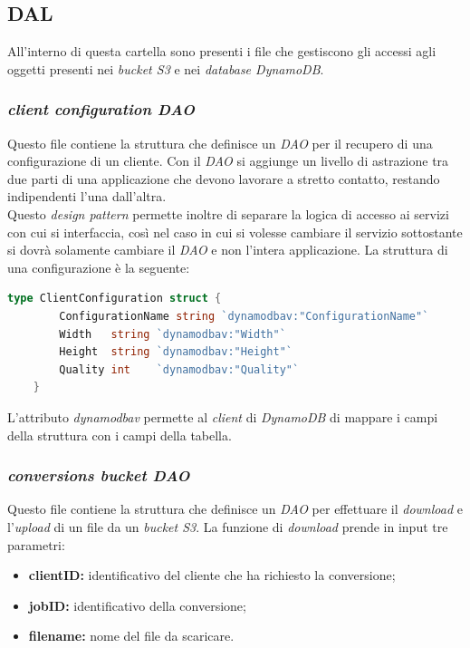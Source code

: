 \subsection{DAL}

All'interno di questa cartella sono presenti i file che gestiscono gli accessi
agli oggetti presenti nei \emph{bucket S3} e nei \emph{database DynamoDB}.

\subsubsection{\emph{client configuration DAO}}

Questo file contiene la struttura che definisce un \emph{DAO} per il recupero di
una configurazione di un cliente. Con il \emph{DAO} si aggiunge un livello di
astrazione tra due parti di una applicazione che devono lavorare a stretto
contatto, restando indipendenti l'una dall'altra.\\
Questo \emph{design pattern} permette inoltre di separare la logica di accesso
ai servizi con cui si interfaccia, così nel caso in cui si volesse cambiare il
servizio sottostante si dovrà solamente cambiare il \emph{DAO} e non l'intera
applicazione. La struttura di una configurazione è la seguente:
\begin{lstlisting}[language=go]
type ClientConfiguration struct {
        ConfigurationName string `dynamodbav:"ConfigurationName"`
        Width   string `dynamodbav:"Width"`
        Height  string `dynamodbav:"Height"`
        Quality int    `dynamodbav:"Quality"`
    }
\end{lstlisting}
L'attributo \emph{dynamodbav} permette al \emph{client} di \emph{DynamoDB} di
mappare i campi della struttura con i campi della tabella.\\

\subsubsection{\emph{conversions bucket DAO}}

Questo file contiene la struttura che definisce un \emph{DAO} per effettuare il
\emph{download} e l'\emph{upload} di un file da un \emph{bucket S3}. La funzione
di \emph{download} prende in input tre parametri:
\begin{itemize}
    \item \textbf{clientID:} identificativo del cliente che ha richiesto la
          conversione;
    \item \textbf{jobID:} identificativo della conversione;
    \item \textbf{filename:} nome del file da scaricare.
\end{itemize}

